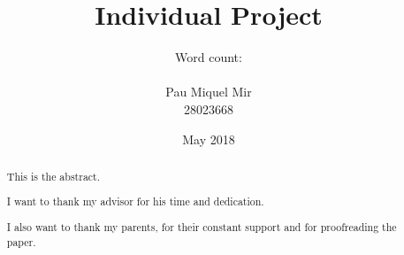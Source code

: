 \documentclass[11pt ,twoside]{article}
\numberwithin{equation}{section}
\newcommand{\candidatenum}{28023668} %
\begin{document}


\title{Individual Project}
\author{
Word count: \\ \\
\vspace{0.1cm}
Pau Miquel Mir\\
\vspace{0.1cm}
\candidatenum \\
}
\date{May 2018}

\maketitle

\cleardoublepage





\begin{abstract}
%

This is the abstract.

\end{abstract}



\cleardoublepage



\renewcommand{\abstractname}{Acknowledgements}
\begin{abstract}	
%

I want to thank my advisor for his time and dedication.


 
 I also want to thank my parents, for their constant support and for proofreading the paper. 


\end{abstract}


\cleardoublepage



\setcounter{tocdepth}{3}

\tableofcontents


\cleardoublepage



\end{document}
